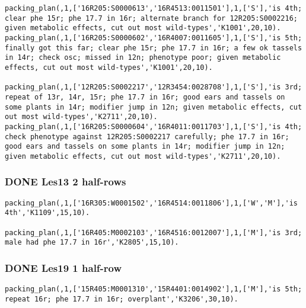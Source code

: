 \documentclass[11pt]{article}
\begin{document}
\begin{verbatim}
packing_plan(,1,['16R205:S0000613','16R4513:0011501'],1,['S'],'is 4th; clear phe 15r; phe 17.7 in 16r; alternate branch for 12R205:S0002216; given metabolic effects, cut out most wild-types','K1001',20,10).
packing_plan(,1,['16R205:S0000602','16R4007:0011605'],1,['S'],'is 5th; finally got this far; clear phe 15r; phe 17.7 in 16r; a few ok tassels in 14r; check osc; missed in 12n; phenotype poor; given metabolic effects, cut out most wild-types','K1001',20,10).

packing_plan(,1,['12R205:S0002217','12R3454:0028708'],1,['S'],'is 3rd; repeat of 13r, 14r, 15r; phe 17.7 in 16r; good ears and tassels on some plants in 14r; modifier jump in 12n; given metabolic effects, cut out most wild-types','K2711',20,10).
packing_plan(,1,['16R205:S0000604','16R4011:0011703'],1,['S'],'is 4th; check phenotype against 12R205:S0002217 carefully; phe 17.7 in 16r; good ears and tassels on some plants in 14r; modifier jump in 12n; given metabolic effects, cut out most wild-types','K2711',20,10).
\end{verbatim}





\subsubsection{{\bfseries\sffamily DONE} Les13 2 half-rows}
\label{sec-4-5-8}

\begin{verbatim}
packing_plan(,1,['16R305:W0001502','16R4514:0011806'],1,['W','M'],'is 4th','K1109',15,10).

packing_plan(,1,['16R405:M0002103','16R4516:0012007'],1,['M'],'is 3rd; male had phe 17.7 in 16r','K2805',15,10).
\end{verbatim}










\subsubsection{{\bfseries\sffamily DONE} Les19 1  half-row}
\label{sec-4-5-9}

\begin{verbatim}
packing_plan(,1,['15R405:M0001310','15R4401:0014902'],1,['M'],'is 5th; repeat 16r; phe 17.7 in 16r; overplant','K3206',30,10).
\end{verbatim}
\end{document}
